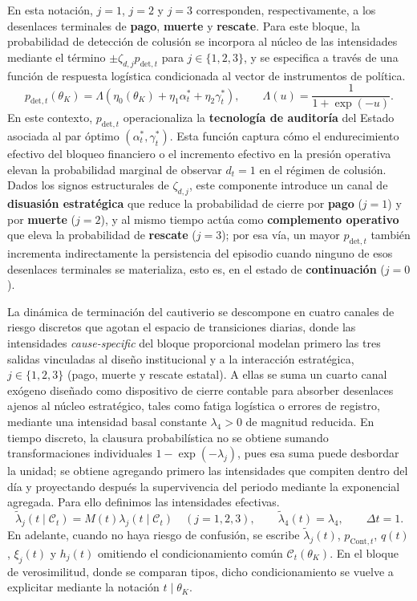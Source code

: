 \documentclass[12pt]{article}
\theoremstyle{definition}
\theoremstyle{remark}
\newcommand{\1}{\mathbf{1}}
\begin{document}
En esta notación, $j=1$, $j=2$ y $j=3$ corresponden, respectivamente, a los desenlaces terminales de \textbf{pago}, \textbf{muerte} y \textbf{rescate}. Para este bloque, la probabilidad de detección de colusión se incorpora al núcleo de las intensidades mediante el término $\pm\zeta_{d,j}p_{\mathrm{det},t}$ para $j\in\{1,2,3\}$, y se especifica a través de una función de respuesta logística condicionada al vector de instrumentos de política.
\[
p_{\mathrm{det},t}(\theta_K)
=
\Lambda(\eta_0(\theta_K) + \eta_1\alpha_t^\ast + \eta_2\gamma_t^\ast),
\qquad
\Lambda(u)=\frac{1}{1+\exp(-u)}.
\]
En este contexto, $p_{\mathrm{det},t}$ operacionaliza la \textbf{tecnología de auditoría} del Estado asociada al par óptimo $(\alpha_t^\ast, \gamma_t^\ast)$. Esta función captura cómo el endurecimiento efectivo del bloqueo financiero o el incremento efectivo en la presión operativa elevan la probabilidad marginal de observar $d_t=1$ en el régimen de colusión. Dados los signos estructurales de $\zeta_{d,j}$, este componente introduce un canal de \textbf{disuasión estratégica} que reduce la probabilidad de cierre por \textbf{pago} ($j=1$) y por \textbf{muerte} ($j=2$), y al mismo tiempo actúa como \textbf{complemento operativo} que eleva la probabilidad de \textbf{rescate} ($j=3$); por esa vía, un mayor $p_{\mathrm{det},t}$ también incrementa indirectamente la persistencia del episodio cuando ninguno de esos desenlaces terminales se materializa, esto es, en el estado de \textbf{continuación} ($j=0$).


La dinámica de terminación del cautiverio se descompone en cuatro canales de riesgo discretos que agotan el espacio de transiciones diarias, donde las intensidades \textit{cause-specific} del bloque proporcional modelan primero las tres salidas vinculadas al diseño institucional y a la interacción estratégica, $j\in\{1,2,3\}$ \textup{(}pago, muerte y rescate estatal\textup{)}. A ellas se suma un cuarto canal exógeno diseñado como dispositivo de cierre contable para absorber desenlaces ajenos al núcleo estratégico, tales como fatiga logística o errores de registro, mediante una intensidad basal constante $\lambda_4>0$ de magnitud reducida. En tiempo discreto, la clausura probabilística no se obtiene sumando transformaciones individuales $1-\exp(-\lambda_j)$, pues esa suma puede desbordar la unidad; se obtiene agregando primero las intensidades que compiten dentro del día y proyectando después la supervivencia del periodo mediante la exponencial agregada. Para ello definimos las intensidades efectivas.
\begin{equation}
\label{eq:hj}
\tilde{\lambda}_j(t\mid\mathcal{C}_t)
=M(t)\lambda_j(t\mid\mathcal{C}_t)\quad (j=1,2,3), 
\qquad
\tilde{\lambda}_4(t)=\lambda_4,
\qquad \Delta t=1.
\end{equation}
\noindent En adelante, cuando no haya riesgo de confusión, se escribe $\tilde{\lambda}_j(t)$, $p_{\mathrm{Cont},t}$, $q(t)$, $\xi_j(t)$ y $h_j(t)$ omitiendo el condicionamiento común $\mathcal{C}_t(\theta_K)$. En el bloque de verosimilitud, donde se comparan tipos, dicho condicionamiento se vuelve a explicitar mediante la notación $t\mid\theta_K$.
\end{document}
